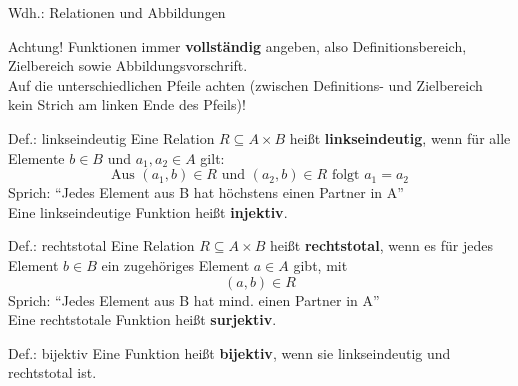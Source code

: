 \begin{frame}{Wdh.: Relationen und Abbildungen}
	\begin{alertblock}{Achtung!}
		Funktionen immer \textbf{vollständig} angeben, also Definitionsbereich, Zielbereich sowie Abbildungsvorschrift. \\
		Auf die unterschiedlichen Pfeile achten (zwischen Definitions- und Zielbereich kein Strich am linken Ende des Pfeils)!
	\end{alertblock}
\end{frame}

\begin{frame}{}%
	\begin{block}{Def.: linkseindeutig}
	\pause
		Eine Relation $R \subseteq A \times B$ heißt \textbf{linkseindeutig}, wenn für alle Elemente $b \in B$ und $a_1, a_2 \in A$ gilt: $$\text{Aus } (a_1,b) \in R \text{ und } (a_2,b) \in R \text{ folgt } a_1 = a_2$$
		Sprich: \enquote{Jedes Element aus B hat höchstens einen Partner in A}\\
		Eine linkseindeutige Funktion heißt \textbf{injektiv}.
	\end{block}
	\pause
	\begin{block}{Def.: rechtstotal}
	\pause
		Eine Relation $R \subseteq A \times B$ heißt \textbf{rechtstotal}, wenn es für jedes Element $b \in B$ ein zugehöriges Element $a \in A$ gibt, mit $$(a,b) \in R$$
		Sprich: \enquote{Jedes Element aus B hat mind. einen Partner in A}\\
		Eine rechtstotale Funktion heißt \textbf{surjektiv}.
	\end{block}
	\pause
	\begin{block}{Def.: bijektiv}
		\pause
		Eine Funktion heißt \textbf{bijektiv}, wenn sie linkseindeutig und rechtstotal ist.
	\end{block}
\end{frame}

